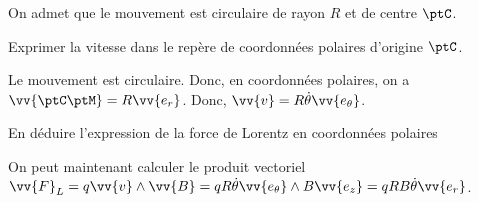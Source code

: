 


\pauseEntrainement


\medskip
On admet que le mouvement est circulaire de rayon $R$ et de centre $\ptC$.


\repriseEntrainement





\hauteurLargeurCadreReponse		{8mm}{4cm}

\begin{enonce}
Exprimer la vitesse dans le repère de coordonnées polaires d'origine $\ptC$.
\end{enonce}


\begin{corrige}
Le mouvement est circulaire. Donc, en coordonnées polaires, on a
$\vv{\ptC \ptM}=R\vv{e_r}$. Donc, $\vv{v}=R\dot{\theta} \vv{e_\theta}$.
\end{corrige}




\begin{enonce}
En déduire l'expression de la force de Lorentz en coordonnées polaires
\end{enonce}


\begin{corrige}
On peut maintenant calculer le produit vectoriel $\vv{F}_L=q\vv{v}\wedge \vv{B}=qR\dot{\theta} \vv{e_\theta} \wedge B\vv{e_z}=qRB\dot{\theta} \vv{e_r}$.
\end{corrige}





